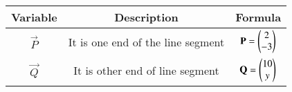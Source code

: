 \begin{center}
    \begin{tabular}{|c|c|c|} 
        \hline
            \textbf{Variable} & \textbf{Description} & \textbf{Formula} \\ 
        \hline
            $\vec{P}$   & It is one end of the line segment & $\mathbf{P} = \begin{pmatrix}2\\-3\end{pmatrix}$ \\ 
        \hline
            $\vec{Q}$   & It is other end of line segment &  $\mathbf{Q} = \begin{pmatrix}10\\y\end{pmatrix}$\\ 
        \hline
    \end{tabular}
\end{center}
